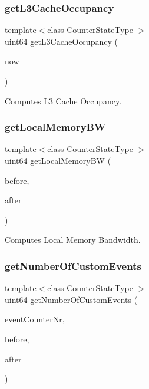 \subsubsection{get\+L3\+Cache\+Occupancy}
{\footnotesize\ttfamily template$<$class Counter\+State\+Type $>$ \\
uint64 get\+L3\+Cache\+Occupancy (\begin{DoxyParamCaption}\item[{const Counter\+State\+Type \&}]{now }\end{DoxyParamCaption})\hspace{0.3cm}{\ttfamily [friend]}}



Computes L3 Cache Occupancy. 

\mbox{\label{classBasicCounterState_a3ba7c9267c6e0f338a59defc98ae0007}} 
\subsubsection{get\+Local\+Memory\+BW}
{\footnotesize\ttfamily template$<$class Counter\+State\+Type $>$ \\
uint64 get\+Local\+Memory\+BW (\begin{DoxyParamCaption}\item[{const Counter\+State\+Type \&}]{before,  }\item[{const Counter\+State\+Type \&}]{after }\end{DoxyParamCaption})\hspace{0.3cm}{\ttfamily [friend]}}



Computes Local Memory Bandwidth. 

\mbox{\label{classBasicCounterState_abaa9d828b52f41866bf7dc8ff491a62e}} 
\subsubsection{get\+Number\+Of\+Custom\+Events}
{\footnotesize\ttfamily template$<$class Counter\+State\+Type $>$ \\
uint64 get\+Number\+Of\+Custom\+Events (\begin{DoxyParamCaption}\item[{int32}]{event\+Counter\+Nr,  }\item[{const Counter\+State\+Type \&}]{before,  }\item[{const Counter\+State\+Type \&}]{after }\end{DoxyParamCaption})\hspace{0.3cm}{\ttfamily [friend]}}



